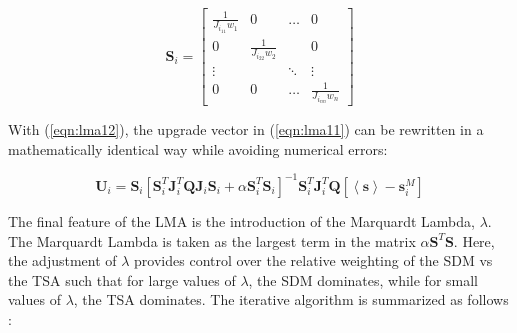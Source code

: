 \begin{equation}
\mathbf{S}_i=\begin{bmatrix}
\frac{1}{J_{i_{11}}w_1} & 0    & \dots  & 0\\ 
0 & \frac{1}{J_{i_{22}}w_2} &        & 0\\ 
\vdots&       & \ddots & \vdots \\ 
0    & 0    & \dots  & \frac{1}{J_{i_{nn}}w_n}
\end{bmatrix}
\label{eqn:lma12}
\end{equation}

With (\ref{eqn:lma12}), the upgrade vector in (\ref{eqn:lma11}) can be rewritten in a mathematically identical way while avoiding numerical errors:

\begin{equation}
\mathbf{U}_i= \mathbf{S}_i\left[\mathbf{S}_i^T\mathbf{J}_i^T\mathbf{Q}\mathbf{J}_i\mathbf{S}_i+\alpha\mathbf{S}_i^T\mathbf{S}_i\right]^{-1}\mathbf{S}_i^T\mathbf{J}_i^T\mathbf{Q}\left[\left<\mathbf{s}\right>-\mathbf{s}^M_i\right]
\label{eqn:lma13}
\end{equation}

The final feature of the LMA is the introduction of the Marquardt Lambda, $\lambda$. The Marquardt Lambda is taken as the largest term in the matrix $\alpha\mathbf{S}^T\mathbf{S}$. Here, the adjustment of $\lambda$ provides control over the relative weighting of the SDM vs the TSA such that for large values of $\lambda$, the SDM dominates, while for small values of $\lambda$, the TSA dominates. The iterative algorithm is summarized as follows \cite{matott_ostrich:_2008}:

